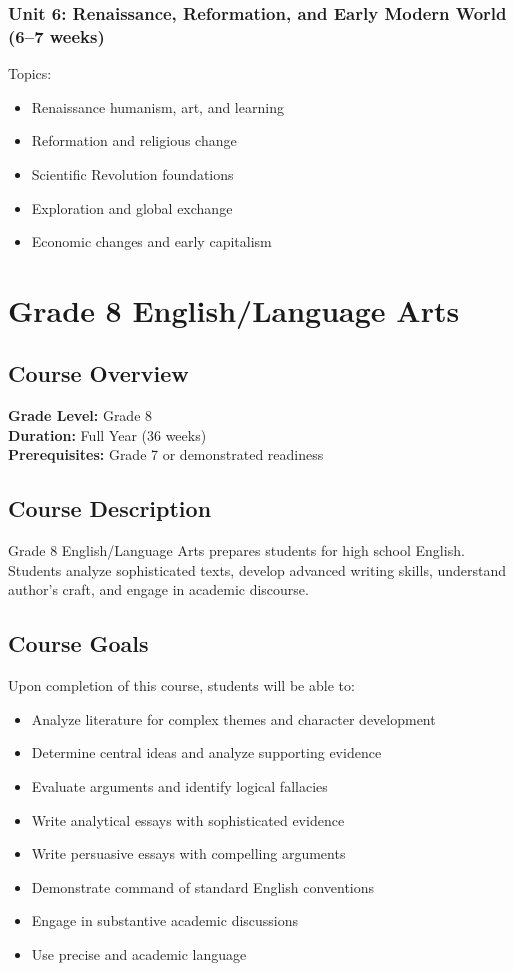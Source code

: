 \documentclass[11pt,letterpaper]{report}
\begin{document}
\subsection{Unit 6: Renaissance, Reformation, and Early Modern World (6–7 weeks)}

Topics:
\begin{itemize}
\item Renaissance humanism, art, and learning
\item Reformation and religious change
\item Scientific Revolution foundations
\item Exploration and global exchange
\item Economic changes and early capitalism
\end{itemize}


\chapter{Grade 8 English/Language Arts}

\section{Course Overview}

\textbf{Grade Level:} Grade 8\\
\textbf{Duration:} Full Year (36 weeks)\\
\textbf{Prerequisites:} Grade 7 or demonstrated readiness

\section{Course Description}

Grade 8 English/Language Arts prepares students for high school English. Students analyze sophisticated texts, develop advanced writing skills, understand author's craft, and engage in academic discourse.

\section{Course Goals}

Upon completion of this course, students will be able to:

\begin{itemize}
    \item Analyze literature for complex themes and character development
    \item Determine central ideas and analyze supporting evidence
    \item Evaluate arguments and identify logical fallacies
    \item Write analytical essays with sophisticated evidence
    \item Write persuasive essays with compelling arguments
    \item Demonstrate command of standard English conventions
    \item Engage in substantive academic discussions
    \item Use precise and academic language
\end{itemize}
\end{document}
